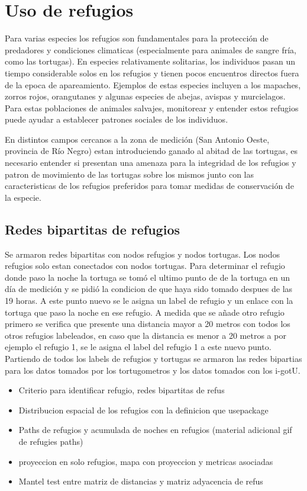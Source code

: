 \chapter{Uso de refugios}
Para varias especies los refugios son fundamentales para la protección de predadores y  condiciones climaticas (especialmente para animales de sangre fría, como las tortugas). En especies relativamente solitarias, los individuos pasan un tiempo considerable solos en los refugios y tienen pocos encuentros directos fuera de la epoca de apareamiento. %
Ejemplos de estas especies incluyen a los mapaches, zorros rojos, orangutanes y algunas especies de abejas, avispas y murcielagos. Para estas poblaciones de animales salvajes, monitorear y entender estos refugios puede ayudar a establecer patrones sociales de los individuos. 

En distintos campos cercanos a la zona de medición (San Antonio Oeste, provincia de Río Negro) estan introduciendo ganado al abitad de las tortugas, es necesario entender si presentan una amenaza para la integridad de los refugios y  patron de movimiento  de las tortugas sobre los mismos junto con las caracteristicas de los refugios preferidos para tomar medidas de conservación de la especie. 

\section{Redes bipartitas de refugios}
Se armaron redes bipartitas con nodos refugios y nodos tortugas. Los nodos refugios solo estan conectados con nodos tortugas. Para determinar el refugio donde paso la noche la tortuga se tomó el ultimo punto de  de la tortuga en un día de medición y se pidió la condicion de que haya sido tomado despues de las 19 horas. A este punto nuevo se le asigna un label de refugio y un enlace con la tortuga que paso la noche en ese refugio. A medida que se añade otro refugio primero se verifica que presente una distancia mayor a 20 metros con todos los otros refugios labeleados, en caso que la distancia es menor a 20 metros a por ejemplo el refugio 1, se le asigna el label del refugio 1 a este nuevo punto. Partiendo de todos los labels de refugios y tortugas se armaron las redes bipartias para los datos tomados por los tortugometros y los datos tomados con los i-gotU.

\begin{itemize}
    \item Criterio para identificar refugio, redes bipartitas de refus
    \item Distribucion espacial de los refugios con la definicion que usepackage
    \item Paths de refugios y acumulada de noches en refugios (material adicional gif de refugies paths)
    \item proyeccion en solo refugios, mapa con proyeccion y metricas asociadas 
    \item Mantel test entre matriz de distancias y matriz adyacencia de refus 
\end{itemize}
